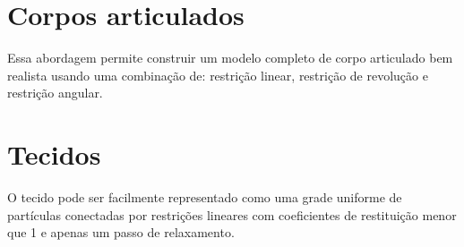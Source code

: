 \section{Corpos articulados}

Essa abordagem permite construir um modelo completo de corpo articulado bem realista usando uma combinação de: restrição linear, restrição de revolução e restrição angular.

\section{Tecidos}

O tecido pode ser facilmente representado como uma grade uniforme de partículas conectadas por restrições lineares com coeficientes de restituição menor que 1 e apenas um passo de relaxamento.
